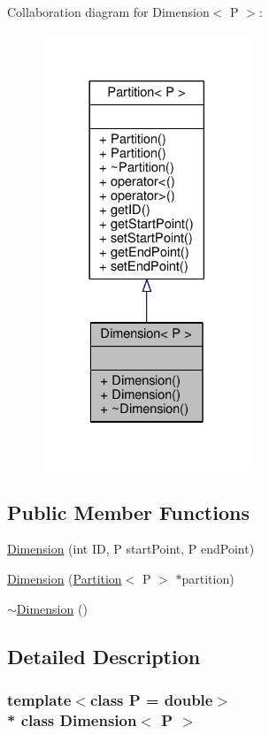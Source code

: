 Collaboration diagram for Dimension$<$ P $>$\+:\nopagebreak
\begin{figure}[H]
\begin{center}
\leavevmode
\includegraphics[width=177pt]{classDimension__coll__graph}
\end{center}
\end{figure}
\subsection*{Public Member Functions}
\begin{DoxyCompactItemize}
\item 
\hyperlink{classDimension_a14b3745b4d7691b33a244306c94c6048}{Dimension} (int ID, P start\+Point, P end\+Point)
\item 
\hyperlink{classDimension_a593dbdfb02f5f33fad25d51a083c3a17}{Dimension} (\hyperlink{classPartition}{Partition}$<$ P $>$ $\ast$partition)
\item 
\hyperlink{classDimension_a371288fa5249dcc26e624a60cd28c92f}{$\sim$\+Dimension} ()
\end{DoxyCompactItemize}


\subsection{Detailed Description}
\subsubsection*{template$<$class P = double$>$\\*
class Dimension$<$ P $>$}

